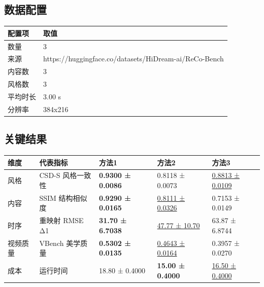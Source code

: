 \documentclass[UTF8,10pt]{ctexart}
\begin{document}
\subsection*{数据配置}
\begin{tabular}{@{}ll@{}}
\toprule
配置项 & 取值 \\
\midrule
数量 & 3 \\
来源 & https://huggingface.co/datasets/HiDream-ai/ReCo-Bench \\
内容数 & 3 \\
风格数 & 3 \\
平均时长 & 3.00 s \\
分辨率 & 384x216 \\
\bottomrule
\end{tabular}
\subsection*{关键结果}
\begin{tabular}{@{}lllll@{}}
\toprule
维度 & 代表指标 & 方法1 & 方法2 & 方法3 \\
\midrule
风格 & CSD-S 风格一致性 & \textbf{0.9300 ± 0.0086} & 0.8118 ± 0.0073 & \underline{0.8813 ± 0.0109} \\
内容 & SSIM 结构相似度 & \textbf{0.9290 ± 0.0165} & \underline{0.8111 ± 0.0326} & 0.7153 ± 0.0149 \\
时序 & 重映射 RMSE Δ1 & \textbf{31.70 ± 6.7038} & \underline{47.77 ± 10.70} & 63.87 ± 6.8744 \\
视频质量 & VBench 美学质量 & \textbf{0.5302 ± 0.0135} & \underline{0.4643 ± 0.0164} & 0.3957 ± 0.0270 \\
成本 & 运行时间 & 18.80 ± 0.4000 & \textbf{15.00 ± 0.4000} & \underline{16.50 ± 0.4000} \\
\bottomrule
\end{tabular}
\end{document}
